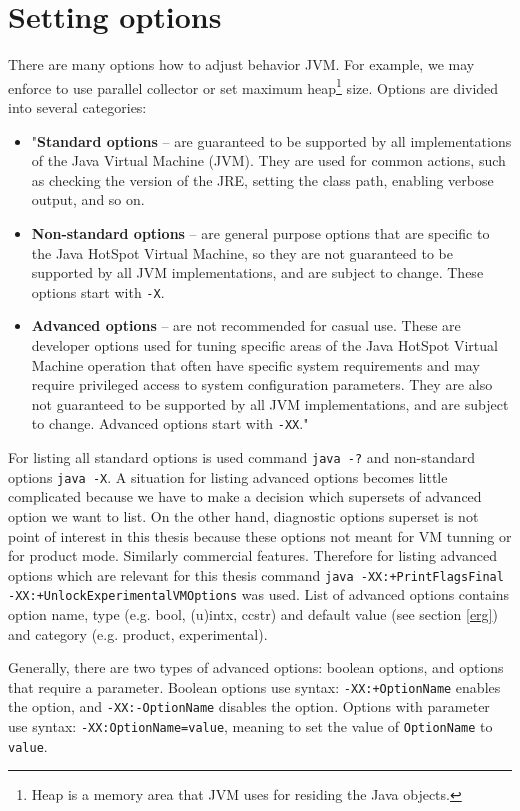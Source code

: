 \documentclass[
  digital, %
  oneside,
  notable, %
  nolof,     %
  nolot     %
]{fithesis3}
\begin{document}
\section{Setting options}
There are many options how to adjust behavior JVM. For example, we may enforce to use parallel collector or set maximum heap\footnote{Heap is a memory area that JVM uses for residing the Java objects.} size. Options are divided into several categories:
\begin{itemize}
	\item "\textbf{Standard options} -- are guaranteed to be supported by all implementations of the Java Virtual Machine (JVM). They are used for common actions, such as checking the version of the JRE, setting the class path, enabling verbose output, and so on.
	\item \textbf{Non-standard options} -- are general purpose options that are specific to the Java HotSpot Virtual Machine, so they are not guaranteed to be supported by all JVM implementations, and are subject to change. These options start with \texttt{-X}.
	\item \textbf{Advanced options} -- are not recommended for casual use. These are developer options used for tuning specific areas of the Java HotSpot Virtual Machine operation that often have specific system requirements and may require privileged access to system configuration parameters. They are also not guaranteed to be supported by all JVM implementations, and are subject to change. Advanced options start with \texttt{-XX}." \cite{java}
\end{itemize}
For listing all standard options is used command \texttt{java -?} and non-standard options \texttt{java -X}. A situation for listing advanced options becomes little complicated because we have to make a decision which supersets of advanced option we want to list. On the other hand, diagnostic options superset is not point of interest in this thesis because these options not meant for VM tunning or for product mode. Similarly commercial features. Therefore for listing advanced options which are relevant for this thesis command \texttt{java -XX:+PrintFlagsFinal -XX:+UnlockExperimentalVMOptions} was used. List of advanced options contains option name, type (e.g. bool, (u)intx, ccstr) and default value (see section \ref{erg}) and category (e.g. product, experimental).

Generally, there are two types of advanced options: boolean options, and options that require a parameter. Boolean options use syntax: \texttt{-XX:+OptionName} enables the option, and \texttt{-XX:-OptionName} disables the option. Options with parameter use syntax: \texttt{-XX:OptionName=value}, meaning to set the value of \texttt{OptionName} to \texttt{value}. \cite{scott}
\end{document}
